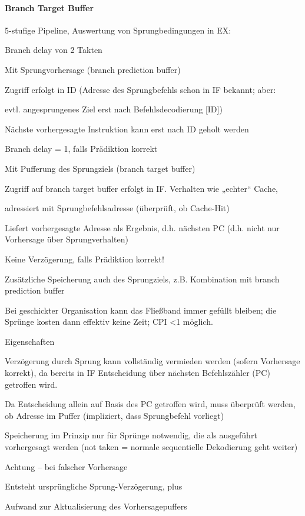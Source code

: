 \documentclass[10pt,landscape]{article}
\begin{document}
\begin{multicols}{3}
  \paragraph{ Branch Target Buffer}
  5-stufige Pipeline, Auswertung von Sprungbedingungen in EX:
  \begin{itemize*}
    \item Branch delay von 2 Takten
    \item Mit Sprungvorhersage (branch prediction buffer)
    \item Zugriff erfolgt in ID (Adresse des Sprungbefehls schon in IF bekannt; aber:
    \item evtl. angesprungenes Ziel erst nach Befehlsdecodierung [ID])
    \item Nächste vorhergesagte Instruktion kann erst nach ID geholt werden
    \item Branch delay = 1, falls Prädiktion korrekt
    \item Mit Pufferung des Sprungziels (branch target buffer)
    \item Zugriff auf branch target buffer erfolgt in IF. Verhalten wie „echter“ Cache,
    \item adressiert mit Sprungbefehlsadresse (überprüft, ob Cache-Hit)
    \item Liefert vorhergesagte Adresse als Ergebnis, d.h. nächsten PC (d.h. nicht nur Vorhersage über Sprungverhalten)
    \item Keine Verzögerung, falls Prädiktion korrekt!
  \end{itemize*}
  
  Zusätzliche Speicherung auch des Sprungziels, z.B. Kombination mit branch prediction buffer
  
  Bei geschickter Organisation kann das Fließband immer gefüllt bleiben; die Sprünge kosten dann effektiv keine Zeit; CPI <1 möglich.
  
  Eigenschaften
  \begin{itemize*}
    \item Verzögerung durch Sprung kann vollständig vermieden werden (sofern Vorhersage korrekt), da bereits in IF Entscheidung über nächsten Befehlszähler (PC) getroffen wird.
    \item Da Entscheidung allein auf Basis des PC getroffen wird, muss überprüft werden, ob Adresse im Puffer (impliziert, dass Sprungbefehl vorliegt)
    \item Speicherung im Prinzip nur für Sprünge notwendig, die als ausgeführt vorhergesagt werden (not taken = normale sequentielle Dekodierung geht weiter)
    \item Achtung – bei falscher Vorhersage
    \item Entsteht ursprüngliche Sprung-Verzögerung, plus
    \item Aufwand zur Aktualisierung des Vorhersagepuffers
  \end{itemize*}
  

\end{multicols}
\end{document}
